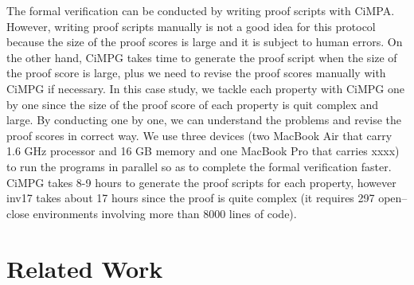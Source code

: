 \documentclass[a4paper,fleqn]{cas-dc}
\begin{document}

The formal verification can be conducted by writing  proof  scripts  with  CiMPA. However, writing proof scripts manually is not a good idea for this protocol because the size of the proof scores is large and it is subject to human errors. On the other hand, CiMPG takes time to generate the proof script when the size of the proof score is large, plus we need to revise the proof scores manually with CiMPG if necessary. In this case study, we tackle each property with
CiMPG one by one since the size of the proof score of each property is quit complex and large. By conducting one by one, we can understand the problems and revise the proof scores in correct way. We use three devices (two MacBook Air that carry 1.6 GHz processor and 16 GB memory and one MacBook Pro that carries xxxx) to run the programs in parallel so as to complete the formal verification faster. CiMPG takes 8-9 hours to generate the proof scripts for each property, however inv17 takes about 17 hours since the proof is quite complex (it requires 297 open–close environments involving more than 8000 lines of code). 


\section{Related Work}\label{relatedwork}
\end{document}
